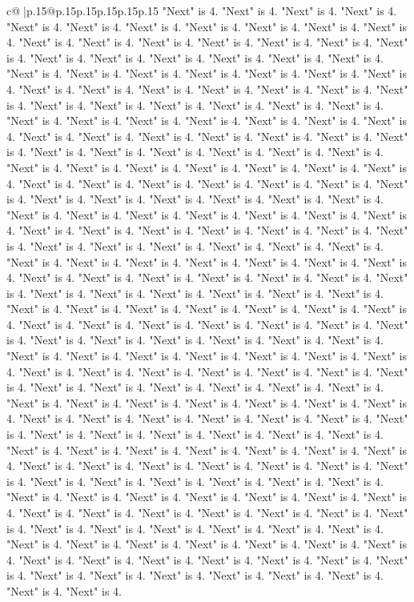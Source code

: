 \documentclass{article}
\begin{document}
{\begin{supertabular}{c@{$\;$}|p{.15\linewidth}@{}p{.15\linewidth}p{.15\linewidth}p{.15\linewidth}p{.15\linewidth}p{.15\linewidth}}
{{{"Next" is 4. "Next" is 4. "Next" is 4. "Next" is 4. "Next" is 4. "Next" is 4. "Next" is 4. "Next" is 4. "Next" is 4. "Next" is 4. "Next" is 4. "Next" is 4. "Next" is 4. "Next" is 4. "Next" is 4. "Next" is 4. "Next" is 4. "Next" is 4. "Next" is 4. "Next" is 4. "Next" is 4. "Next" is 4. "Next" is 4. "Next" is 4. "Next" is 4. "Next" is 4. "Next" is 4. "Next" is 4. "Next" is 4. "Next" is 4. "Next" is 4. "Next" is 4. "Next" is 4. "Next" is 4. "Next" is 4. "Next" is 4. "Next" is 4. "Next" is 4. "Next" is 4. "Next" is 4. "Next" is 4. "Next" is 4. "Next" is 4. "Next" is 4. "Next" is 4. "Next" is 4. "Next" is 4. "Next" is 4. "Next" is 4. "Next" is 4. "Next" is 4. "Next" is 4. "Next" is 4. "Next" is 4. "Next" is 4. "Next" is 4. "Next" is 4. "Next" is 4. "Next" is 4. "Next" is 4. "Next" is 4. "Next" is 4. "Next" is 4. "Next" is 4. "Next" is 4. "Next" is 4. "Next" is 4. "Next" is 4. "Next" is 4. "Next" is 4. "Next" is 4. "Next" is 4. "Next" is 4. "Next" is 4. "Next" is 4. "Next" is 4. "Next" is 4. "Next" is 4. "Next" is 4. "Next" is 4. "Next" is 4. "Next" is 4. "Next" is 4. "Next" is 4. "Next" is 4. "Next" is 4. "Next" is 4. "Next" is 4. "Next" is 4. "Next" is 4. "Next" is 4. "Next" is 4. "Next" is 4. "Next" is 4. "Next" is 4. "Next" is 4. "Next" is 4. "Next" is 4. "Next" is 4. "Next" is 4. "Next" is 4. "Next" is 4. "Next" is 4. "Next" is 4. "Next" is 4. "Next" is 4. "Next" is 4. "Next" is 4. "Next" is 4. "Next" is 4. "Next" is 4. "Next" is 4. "Next" is 4. "Next" is 4. "Next" is 4. "Next" is 4. "Next" is 4. "Next" is 4. "Next" is 4. "Next" is 4. "Next" is 4. "Next" is 4. "Next" is 4. "Next" is 4. "Next" is 4. "Next" is 4. "Next" is 4. "Next" is 4. "Next" is 4. "Next" is 4. "Next" is 4. "Next" is 4. "Next" is 4. "Next" is 4. "Next" is 4. "Next" is 4. "Next" is 4. "Next" is 4. "Next" is 4. "Next" is 4. "Next" is 4. "Next" is 4. "Next" is 4. "Next" is 4. "Next" is 4. "Next" is 4. "Next" is 4. "Next" is 4. "Next" is 4. "Next" is 4. "Next" is 4. "Next" is 4. "Next" is 4. "Next" is 4. "Next" is 4. "Next" is 4. "Next" is 4. "Next" is 4. "Next" is 4. "Next" is 4. "Next" is 4. "Next" is 4. "Next" is 4. "Next" is 4. "Next" is 4. "Next" is 4. "Next" is 4. "Next" is 4. "Next" is 4. "Next" is 4. "Next" is 4. "Next" is 4. "Next" is 4. "Next" is 4. "Next" is 4. "Next" is 4. "Next" is 4. "Next" is 4. "Next" is 4. "Next" is 4. "Next" is 4. "Next" is 4. "Next" is 4. "Next" is 4. "Next" is 4. "Next" is 4. "Next" is 4. "Next" is 4. "Next" is 4. "Next" is 4. "Next" is 4. "Next" is 4. "Next" is 4. "Next" is 4. "Next" is 4. "Next" is 4. "Next" is 4. "Next" is 4. "Next" is 4. "Next" is 4. "Next" is 4. "Next" is 4. "Next" is 4. "Next" is 4. "Next" is 4. "Next" is 4. "Next" is 4. "Next" is 4. "Next" is 4. "Next" is 4. "Next" is 4. "Next" is 4. "Next" is 4. "Next" is 4. "Next" is 4. "Next" is 4. "Next" is 4. "Next" is 4. "Next" is 4. "Next" is 4. "Next" is 4. "Next" is 4. "Next" is 4. "Next" is 4. "Next" is 4. "Next" is 4. "Next" is 4. "Next" is 4. "Next" is 4. "Next" is 4. "Next" is 4. "Next" is 4. "Next" is 4. "Next" is 4. "Next" is 4. "Next" is 4. "Next" is 4. "Next" is 4. "Next" is 4. "Next" is 4. "Next" is 4. "Next" is 4. "Next" is 4. "Next" is 4. "Next" is 4. "Next" is 4. }}}
\end{supertabular}}
\end{document}
